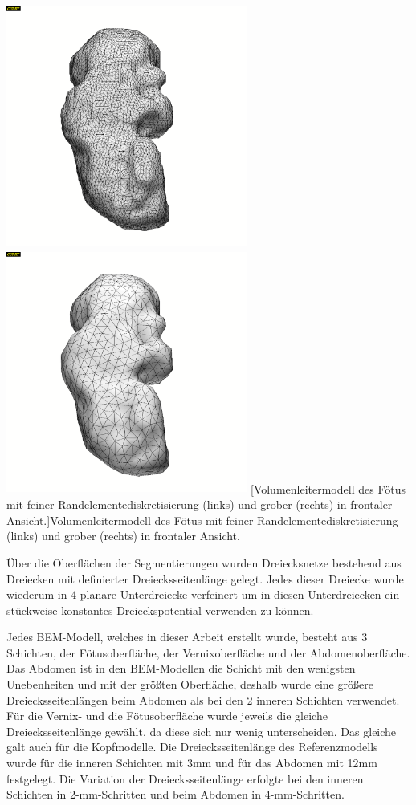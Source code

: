 \begin{center}
\includegraphics[width=7.92cm,height=7.99cm]{BA-img/BA-img4.pdf}\includegraphics[width=7.92cm,height=7.99cm]{BA-img/BA-img5.pdf}
[Volumenleitermodell des Fötus mit feiner
Randelementediskretisierung (links) und grober (rechts) in frontaler
Ansicht.]{Volumenleitermodell des Fötus mit feiner
Randelementediskretisierung (links) und grober (rechts) in frontaler
Ansicht.}
\label{seq:refIllustration2}

\end{center}
Über die Oberflächen der Segmentierungen wurden Dreiecksnetze bestehend
aus Dreiecken mit definierter Dreiecksseitenlänge gelegt. Jedes dieser
Dreiecke wurde wiederum in 4 planare Unterdreiecke verfeinert um in
diesen Unterdreiecken ein stückweise konstantes Dreieckspotential
verwenden zu können.

Jedes BEM-Modell, welches in dieser Arbeit erstellt wurde, besteht aus 3
Schichten, der Fötusoberfläche, der Vernixoberfläche und der
Abdomenoberfläche. Das Abdomen ist in den BEM-Modellen die Schicht mit
den wenigsten Unebenheiten und mit der größten Oberfläche, deshalb
wurde eine größere Dreiecksseitenlängen beim Abdomen als bei den 2
inneren Schichten verwendet. Für die Vernix- und die Fötusoberfläche
wurde jeweils die gleiche Dreiecksseitenlänge gewählt, da diese sich
nur wenig unterscheiden. Das gleiche galt auch für die Kopfmodelle. Die
Dreiecksseitenlänge des Referenzmodells wurde für die inneren Schichten
mit 3mm und für das Abdomen mit 12mm festgelegt. Die Variation der
Dreiecksseitenlänge erfolgte bei den inneren Schichten in
2-mm-Schritten und beim Abdomen in 4-mm-Schritten.

